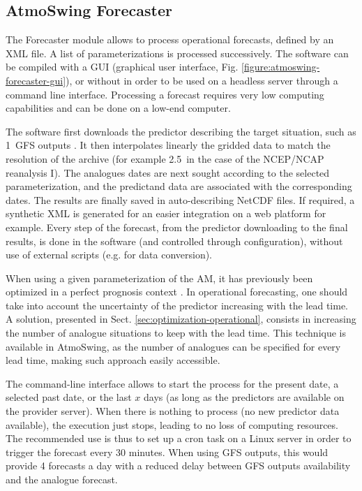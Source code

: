 \documentclass[review]{elsarticle}
\begin{document}
\subsection{AtmoSwing Forecaster}
\label{sec:forecaster}

The Forecaster module allows to process operational forecasts, defined by an XML file. A list of parameterizations is processed successively. The software can be compiled with a GUI (graphical user interface, Fig. \ref{figure:atmoswing-forecaster-gui}), or without in order to be used on a headless server through a command line interface. Processing a forecast requires very low computing capabilities and can be done on a low-end computer. 

The software first downloads the predictor describing the target situation, such as 1\degree\ GFS outputs \citep[Global Forecast System,][see Sect. \ref{sec:data}]{Kanamitsu1991,Kanamitsu1989}. It then interpolates linearly the gridded data to match the resolution of the archive (for example 2.5\degree\ in the case of the NCEP/NCAP reanalysis I). The analogues dates are next sought according to the selected parameterization, and the predictand data are associated with the corresponding dates. The results are finally saved in auto-describing NetCDF files. If required, a synthetic XML is generated for an easier integration on a web platform for example. Every step of the forecast, from the predictor downloading to the final results, is done in the software (and controlled through configuration), without use of external scripts (e.g. for data conversion).

When using a given parameterization of the AM, it has previously been optimized in a perfect prognosis context \citep[i.e. by optimizing on the reanalysis dataset; however, this does not take into account the uncertainty of the target situation when taken from operational forecasts of a Numerical Weather Prediction model,][]{Klein1963}. In operational forecasting, one should take into account the uncertainty of the predictor increasing with the lead time. A solution, presented in Sect. \ref{sec:optimization-operational}, consists in increasing the number of analogue situations to keep with the lead time. This technique is available in AtmoSwing, as the number of analogues can be specified for every lead time, making such approach easily accessible.

The command-line interface allows to start the process for the present date, a selected past date, or the last $x$ days (as long as the predictors are available on the provider server). When there is nothing to process (no new predictor data available), the execution just stops, leading to no loss of computing resources. The recommended use is thus to set up a cron task on a Linux server in order to trigger the forecast every 30 minutes. When using GFS outputs, this would provide 4 forecasts a day with a reduced delay between GFS outputs availability and the analogue forecast.
\end{document}
